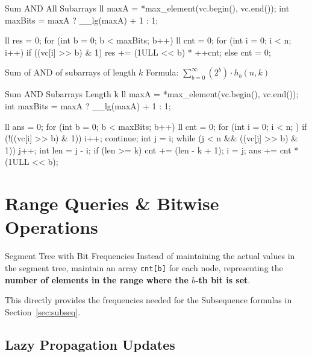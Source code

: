 \documentclass[10pt]{article}
\newcommand{\complexity}[1]{%
  \tcbox[on line,
    colback=tagbg,
    colframe=tagbg,
    boxrule=0pt,
    arc=2pt,
    boxsep=0pt,
    left=3.5pt, right=3.5pt, top=1.5pt, bottom=1.5pt
  ]{\color{tagtext}\scriptsize\bfseries\ensuremath{#1}}%
}
\begin{document}
\begin{vscode}{Sum AND All Subarrays \complexity{O(N \log(\max A))}}
ll maxA = *max_element(vc.begin(), vc.end());
int maxBits = maxA ? __lg(maxA) + 1 : 1;

ll res = 0;
for (int b = 0; b < maxBits; b++) 
{
    ll cnt = 0;
    for (int i = 0; i < n; i++) 
    {
        if ((vc[i] >> b) & 1) 
            res += (1ULL << b) * ++cnt;
        else 
            cnt = 0;
    }
}
\end{vscode}

\begin{conceptbox}{Sum of AND of subarrays of length $k$}
    Formula: $\sum_{b = 0}^{\infty} (2^b) \cdot h_b(n, k)$
\end{conceptbox}

\begin{vscode}{Sum AND Subarrays Length k \complexity{O(N \log(\max A))}}
ll maxA = *max_element(vc.begin(), vc.end());
int maxBits = maxA ? __lg(maxA) + 1 : 1;

ll ans = 0;
for (int b = 0; b < maxBits; b++) 
{
    ll cnt = 0;
    for (int i = 0; i < n; ) 
    {
        if (!((vc[i] >> b) & 1)) 
        { 
            i++; 
            continue; 
        }
        int j = i;
        while (j < n && ((vc[j] >> b) & 1)) 
            j++;
        int len = j - i;
        if (len >= k) 
            cnt += (len - k + 1);
        i = j;
    }
    ans += cnt * (1ULL << b);
}
\end{vscode}

\section{Range Queries \& Bitwise Operations}

\begin{conceptbox}{Segment Tree with Bit Frequencies}
    Instead of maintaining the actual values in the segment tree, maintain an array \texttt{cnt[b]} for each node, representing the \textbf{number of elements in the range where the $b$-th bit is set}.
    
    This directly provides the frequencies needed for the Subsequence formulas in Section~\ref{sec:subseq}.
\end{conceptbox}

\subsection{Lazy Propagation Updates}
\end{document}
